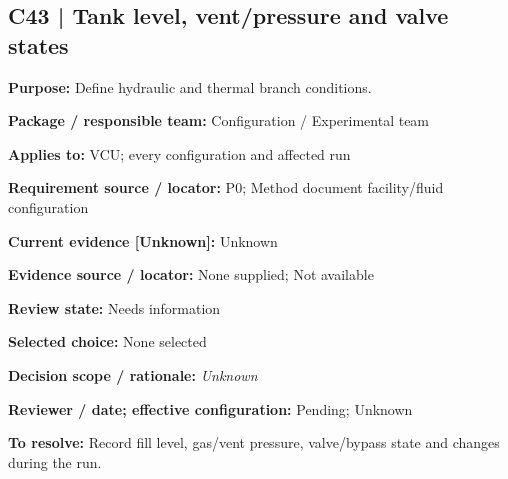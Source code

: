 \documentclass[11pt]{article}
\begin{document}
\begin{minipage}{\textwidth}\small\setlength{\parskip}{2pt}
\subsection*{C43 | Tank level, vent/pressure and valve states}
\textbf{Purpose:} Define hydraulic and thermal branch conditions.\par
\textbf{Package / responsible team:} Configuration / Experimental team\par
\textbf{Applies to:} VCU; every configuration and affected run\par
\textbf{Requirement source / locator:} P0; Method document facility/fluid configuration\par
\textbf{Current evidence [Unknown]:} Unknown\par
\textbf{Evidence source / locator:} None supplied; Not available\par
\textbf{Review state:} Needs information\par
\textbf{Selected choice:} None selected\par
\textbf{Decision scope / rationale:} \textit{Unknown}\par
\textbf{Reviewer / date; effective configuration:} Pending; Unknown\par
\textbf{To resolve:} Record fill level, gas/vent pressure, valve/bypass state and changes during the run.\par
\end{minipage}\par\vspace{5pt}
\end{document}
